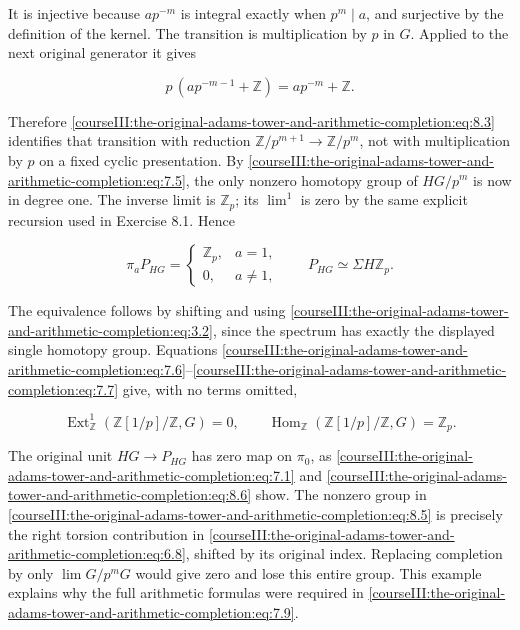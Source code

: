 It is injective because \(ap^{-m}\) is integral exactly when \(p^m\mid a\), and surjective by the definition of the kernel. The transition is multiplication by \(p\) in \(G\). Applied to the next original generator it gives

\begin{equation}
p\,(ap^{-m-1}+\mathbb Z)=ap^{-m}+\mathbb Z.
\label{courseIII:the-original-adams-tower-and-arithmetic-completion:eq:8.4}
\end{equation}

Therefore \eqref{courseIII:the-original-adams-tower-and-arithmetic-completion:eq:8.3} identifies that transition with reduction \(\mathbb Z/p^{m+1}\to\mathbb Z/p^m\), not with multiplication by \(p\) on a fixed cyclic presentation. By \eqref{courseIII:the-original-adams-tower-and-arithmetic-completion:eq:7.5}, the only nonzero homotopy group of \(HG/p^m\) is now in degree one. The inverse limit is \(\mathbb Z_p\); its \(\lim^1\) is zero by the same explicit recursion used in Exercise 8.1. Hence

\begin{equation}
\pi_aP_{HG}=\begin{cases}\mathbb Z_p,&a=1,\\0,&a\ne1,\end{cases}
\qquad P_{HG}\simeq\Sigma H\mathbb Z_p.
\label{courseIII:the-original-adams-tower-and-arithmetic-completion:eq:8.5}
\end{equation}

The equivalence follows by shifting and using \eqref{courseIII:the-original-adams-tower-and-arithmetic-completion:eq:3.2}, since the spectrum has exactly the displayed single homotopy group. Equations \eqref{courseIII:the-original-adams-tower-and-arithmetic-completion:eq:7.6}--\eqref{courseIII:the-original-adams-tower-and-arithmetic-completion:eq:7.7} give, with no terms omitted,

\begin{equation}
\operatorname{Ext}^1_{\mathbb Z}(\mathbb Z[1/p]/\mathbb Z,G)=0,
\qquad
\operatorname{Hom}_{\mathbb Z}(\mathbb Z[1/p]/\mathbb Z,G)=\mathbb Z_p.
\label{courseIII:the-original-adams-tower-and-arithmetic-completion:eq:8.6}
\end{equation}

The original unit \(HG\to P_{HG}\) has zero map on \(\pi_0\), as \eqref{courseIII:the-original-adams-tower-and-arithmetic-completion:eq:7.1} and \eqref{courseIII:the-original-adams-tower-and-arithmetic-completion:eq:8.6} show. The nonzero group in \eqref{courseIII:the-original-adams-tower-and-arithmetic-completion:eq:8.5} is precisely the right torsion contribution in \eqref{courseIII:the-original-adams-tower-and-arithmetic-completion:eq:6.8}, shifted by its original index. Replacing completion by only \(\lim G/p^mG\) would give zero and lose this entire group. This example explains why the full arithmetic formulas were required in \eqref{courseIII:the-original-adams-tower-and-arithmetic-completion:eq:7.9}.

